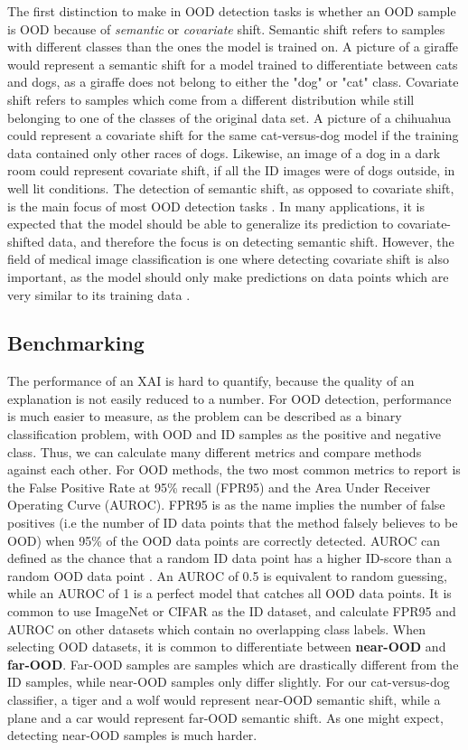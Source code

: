 \documentclass[UKenglish]{uiomasterthesis} %
\theoremstyle{definition}
\begin{document}
The first distinction to make in OOD detection tasks is whether an OOD sample is OOD because of {\it semantic} or {\it covariate} shift. Semantic shift refers to samples with different classes than the ones the model is trained on. A picture of a giraffe would represent a semantic shift for a model trained to differentiate between cats and dogs, as a giraffe does not belong to either the "dog" or "cat" class. Covariate shift refers to samples which come from a different distribution while still belonging to one of the classes of the original data set. A picture of a chihuahua could represent a covariate shift for the same cat-versus-dog model if the training data contained only other races of dogs. Likewise, an image of a dog in a dark room could represent covariate shift, if all the ID images were of dogs outside, in well lit conditions. The detection of semantic shift, as opposed to covariate shift, is the main focus of most OOD detection tasks \cite{oodoverview}. In many applications, it is expected that the model should be able to generalize its prediction to covariate-shifted data, and therefore the focus is on detecting semantic shift. However, the field of medical image classification is one where detecting covariate shift is also important, as the model should only make predictions on data points which are very similar to its training data \cite{oodoverview}.


\subsection{Benchmarking}

The performance of an XAI is hard to quantify, because the quality of an explanation is not easily reduced to a number. For OOD detection, performance is much easier to measure, as the problem can be described as a binary classification problem, with OOD and ID samples as the positive and negative class. Thus, we can calculate many different metrics and compare methods against each other. For OOD methods, the two most common metrics to report is the False Positive Rate at 95\% recall (FPR95) and the Area Under Receiver Operating Curve (AUROC). FPR95 is as the name implies the number of false positives (i.e the number of ID data points that the method falsely believes to be OOD) when 95\% of the OOD data points are correctly detected. AUROC can defined as the chance that a random ID data point has a higher ID-score than a random OOD data point \cite{openood}. An AUROC of 0.5 is equivalent to random guessing, while an AUROC of 1 is a perfect model that catches all OOD data points. It is common to use ImageNet or CIFAR as the ID dataset, and calculate FPR95 and AUROC on other datasets which contain no overlapping class labels. When selecting OOD datasets, it is common to differentiate between \textbf{near-OOD} and \textbf{far-OOD}. Far-OOD samples are samples which are drastically different from the ID samples, while near-OOD samples only differ slightly. For our cat-versus-dog classifier, a tiger and a wolf would represent near-OOD semantic shift, while a plane and a car would represent far-OOD semantic shift. As one might expect, detecting near-OOD samples is much harder.
\end{document}
